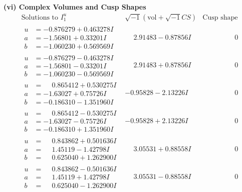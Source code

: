 \documentclass[1p]{elsarticle_modified}
\theoremstyle{definition}
\newcommand{\I}{\sqrt{-1}}
\begin{document}
\newpage\flushleft \textbf{(vi) Complex Volumes and Cusp Shapes}
$$\begin{array}{c|c|c}  
\text{Solutions to }I^u_{1}& \I (\text{vol} + \sqrt{-1}CS) & \text{Cusp shape}\\
 \hline 
\begin{aligned}
u &= -0.876279 + 0.463278 I \\
a &= -1.56801 + 0.33201 I \\
b &= -1.060230 + 0.569569 I\end{aligned}
 & \phantom{-}2.91483 - 0.87856 I & \phantom{-0.000000 } 0 \\ \hline\begin{aligned}
u &= -0.876279 - 0.463278 I \\
a &= -1.56801 - 0.33201 I \\
b &= -1.060230 - 0.569569 I\end{aligned}
 & \phantom{-}2.91483 + 0.87856 I & \phantom{-0.000000 } 0 \\ \hline\begin{aligned}
u &= \phantom{-}0.865412 + 0.530275 I \\
a &= -1.63027 + 0.75726 I \\
b &= -0.186310 - 1.351960 I\end{aligned}
 & -0.95828 - 2.13226 I & \phantom{-0.000000 } 0 \\ \hline\begin{aligned}
u &= \phantom{-}0.865412 - 0.530275 I \\
a &= -1.63027 - 0.75726 I \\
b &= -0.186310 + 1.351960 I\end{aligned}
 & -0.95828 + 2.13226 I & \phantom{-0.000000 } 0 \\ \hline\begin{aligned}
u &= \phantom{-}0.843862 + 0.501636 I \\
a &= \phantom{-}1.45119 - 1.42798 I \\
b &= \phantom{-}0.625040 + 1.262900 I\end{aligned}
 & \phantom{-}3.05531 + 0.88558 I & \phantom{-0.000000 } 0 \\ \hline\begin{aligned}
u &= \phantom{-}0.843862 - 0.501636 I \\
a &= \phantom{-}1.45119 + 1.42798 I \\
b &= \phantom{-}0.625040 - 1.262900 I\end{aligned}
 & \phantom{-}3.05531 - 0.88558 I & \phantom{-0.000000 } 0 \\ \hline\begin{aligned}

\end{aligned}
\end{array}$$
\end{document}
